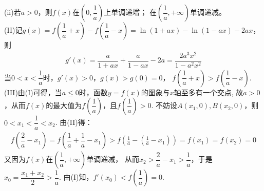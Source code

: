 \begin{enumerate}[label={\textbf{\arabic*.}},leftmargin=
    \inteval{\myenumleftmargin}pt]
(ii)若$a>0$，则$ f(x) $在$ \left(0,\dfrac{1}{a}\right) $上单调递增；
在$\left(\dfrac{1}{a},+\infty\right)$单调递减。\\
(II)记$g(x)=f\left(\dfrac{1}{a}+x\right)-f\left(\dfrac{1}{a}-x\right)
=\ln(1+ax)-\ln(1-ax)-2ax $，则
\begin{gather*}
    g'(x)=\dfrac{a}{1+ax}+\dfrac{a}{1-ax}-2a=\dfrac{2a^{3}x^{2}}{1-a^{2}x^{2}}
\end{gather*}
当$0<x<\dfrac{1}{a}$时，$g'(x)>0$，$ g(x)>g(0)=0 $，
$f\left(\dfrac{1}{a}+x\right)>f\left(\dfrac{1}{a}-x\right)$.\\
(III)由(I)可得，当$a\leqslant0$时，函数$y=f(x)$的图象与$x$轴至多有一个交点,
故$a>0$，从而$f(x)$的最大值为$f\left(\dfrac{1}{a}\right)$，且$f\left(\dfrac{1}{a}\right)>0$.
不妨设$A\left(x_{1},0\right),B\left(x_{2},0\right)$，则$0<x_{1}<\dfrac{1}{a}<x_{2}$.
由(II)得：
\begin{gather*}
    f\left(\dfrac{2}{a}-x_{1}\right)=f\left(\dfrac{1}{a}+\dfrac{1}{a}-x_{1}\right)
    >f\left(\frac{1}{a}-\left(\frac{1}{a}-x_{1}\right)\right)=
    f\left(x_{1}\right)=f\left(x_{2}\right)=0
\end{gather*}
又因为$f(x)$在$\left(\dfrac{1}{a},+\infty\right)$单调递减，
从而$x_{2}>\dfrac{2}{a}-x_{1}>\dfrac{1}{a} $，于是$x_{0}=\dfrac{x_{1}+x_{2}}{2}>\dfrac{1}{a}$.
由(I)知，$f'\left(x_{0}\right)<f\left(\dfrac{1}{a}\right)=0 $.


\end{enumerate}
